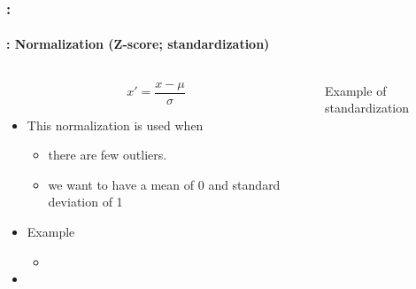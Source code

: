\documentclass[xcolor=table]{beamer}
\begin{document}
\begin{frame}
	\frametitle{\insertshortsubtitle: \insertsection}
	\framesubtitle{\insertsubsection: Normalization (Z-score; standardization)}
	
	\begin{columns}
	\begin{column}{.5\textwidth}
	\[x' = \frac{x - \mu}{\sigma}	\]
	
	\begin{itemize}
		\item This normalization is used when
		\begin{itemize}
			\item there are few outliers.
			\item we want to have a mean of 0 and standard deviation of 1
		\end{itemize}
		\item Example
		\begin{itemize}
			\item {}
		\end{itemize}
		\item {}
	\end{itemize}
	\end{column}
	\begin{column}{.5\textwidth}
		
		\begin{center}
			Example of standardization \cite{2021-google-prep}
		\end{center}
	\end{column}
\end{columns}
	
\end{frame}
\end{document}
